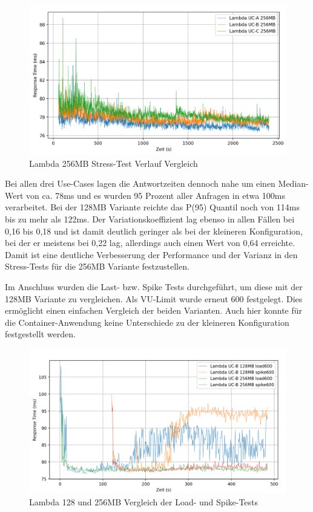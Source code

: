 \begin{figure}[H]
    \includegraphics[width=\textwidth]{img/lambda256-stress1000-comparison-graph.png}
    \caption[Lambda 256MB Stress-Test Verlauf Vergleich]{Lambda 256MB Stress-Test Verlauf Vergleich}
    \label{fig:lambda256-stress1000-comparison-graph}
\end{figure}

Bei allen drei Use-Cases lagen die Antwortzeiten dennoch nahe um einen Median-Wert von ca. 78ms und es wurden 95 Prozent aller Anfragen in etwa 100ms verarbeitet. Bei der 128MB Variante reichte das P(95) Quantil noch von 114ms bis zu mehr als 122ms. Der Variationskoeffizient lag ebenso in allen Fällen bei 0,16 bis 0,18 und ist damit deutlich geringer als bei der kleineren Konfiguration, bei der er meistens bei 0,22 lag, allerdings auch einen Wert von 0,64 erreichte. Damit ist eine deutliche Verbesserung der Performance und der Varianz in den Stress-Tests für die 256MB Variante festzustellen.

Im Anschluss wurden die Last- bzw. Spike Tests durchgeführt, um diese mit der 128MB Variante zu vergleichen. Als VU-Limit wurde erneut 600 festgelegt. Dies ermöglicht einen einfachen Vergleich der beiden Varianten.
Auch hier konnte für die Container-Anwendung keine Unterschiede zu der kleineren Konfiguration festgestellt werden. 

\begin{figure}[H]
    \includegraphics[width=\textwidth]{img/lambda128+256-ucb-load600-vs-spike600-graph.png}
    \caption[Lambda 128MB und 256MB Vergleich der Load- und Spike-Tests]{Lambda 128 und 256MB Vergleich der Load- und Spike-Tests}
    \label{fig:lambda128+256-ucb-load600-vs-spike600-graph}
\end{figure}

